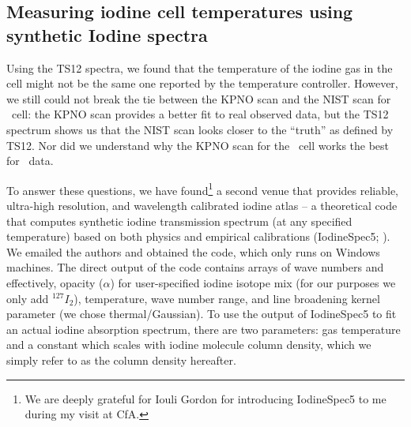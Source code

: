 \subsection{Measuring iodine cell temperatures using synthetic Iodine spectra}

Using the TS12 spectra, we found that the temperature of the iodine
gas in the cell might not be the same one reported by the temperature
controller. However, we still could not break the tie between the KPNO
scan and the NIST scan for \het\ cell: the KPNO scan provides a better
fit to real observed data, but the TS12 spectrum shows us that the
NIST scan looks closer to the ``truth'' as defined by TS12. Nor did we
understand why the KPNO scan for the \keck\ cell works the best for
\het\ data.

To answer these questions, we have found\footnote{We are deeply
  grateful for Iouli Gordon for introducing IodineSpec5 to me
  during my visit at CfA.} a second venue that provides
reliable, ultra-high resolution, and wavelength calibrated iodine
atlas -- a theoretical code that computes synthetic iodine
transmission spectrum (at any specified temperature) based on both
physics and empirical calibrations (IodineSpec5;
\citealt{iodinespec5}). We emailed the authors and obtained the code,
which only runs on Windows machines. The direct output of the code
contains arrays of wave numbers and effectively, opacity ($\alpha$) for user-specified
iodine isotope mix (for our purposes we only add $^{127}I_2$),
temperature, wave number range, and line broadening kernel parameter
(we chose thermal/Gaussian). To use the output of IodineSpec5 to fit
an actual iodine absorption spectrum, there are two parameters:
gas temperature and a constant which scales with iodine molecule
column density, which we simply refer to as the column density hereafter.

